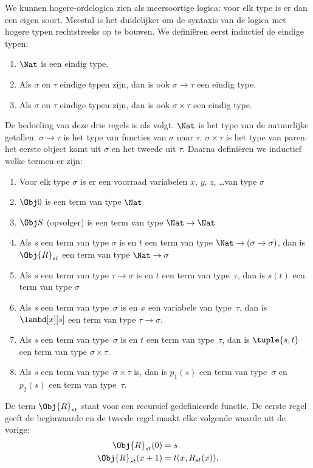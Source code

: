 \documentclass[openany]{memoir}
\begin{document}
We kunnen hogere-ordelogica zien als meersoortige logica: voor elk type is er
dan een eigen soort. Meestal is het duidelijker om de syntaxis van de logica
met hogere typen rechtstreeks op te bouwen. We definiëren eerst inductief de
eindige typen:
\begin{enumerate}
\item $\Nat$ is een eindig type.
\item Als $\sigma$ en $\tau$ eindige typen zijn, dan is ook $\sigma
  \to \tau$ een eindig type.
\item Als $\sigma$ en $\tau$ eindige typen zijn, dan is ook $\sigma \times
  \tau$ een eindig type.
\end{enumerate}
De bedoeling van deze drie regels is als volgt. $\Nat$ is het type van de
natuurlijke getallen. $\sigma \to \tau$ is het type van functies van
$\sigma$ naar $\tau$. $\sigma \times \tau$ is het type van paren: het eerste
object komt uit $\sigma$ en het tweede uit $\tau$. Daarna definiëren we
inductief welke termen er zijn:
\begin{enumerate}
\item Voor elk type $\sigma$ is er een voorraad variabelen $x$, $y$,
  $z$, \dots van type $\sigma$
\item $\Obj 0$ is een term van type $\Nat$
\item $\Obj S$ (opvolger) is een term van type $\Nat \to \Nat$
\item Als $s$ een term van type $\sigma$ is en $t$ een term van type
  $\Nat \to (\sigma \to \sigma)$, dan is $\Obj{R}_{st}$ een term van type
  $\Nat \to \sigma$
\item Als $s$ een term van type $\tau \to \sigma$ is en $t$ een
  term van type~$\tau$, dan is $s(t)$ een term van type $\sigma$
\item Als $s$ een term van type~$\sigma$ is en $x$ een variabele van
  type~$\tau$, dan is $\lambd[x][s]$ een term van type $\tau \to \sigma$.
\item Als $s$ een term van type~$\sigma$ is en $t$ een term van
  type~$\tau$, dan is $\tuple{s, t}$ een term van type $\sigma \times
  \tau$.
\item Als $s$ een term van type~$\sigma \times \tau$ is, dan is $p_1(s)$ een
  term van type~$\sigma$ en $p_2(s)$ een term van type~$\tau$.
\end{enumerate}
De term $\Obj{R}_{st}$ staat voor een recursief gedefinieerde functie. De
eerste regel geeft de beginwaarde en de tweede regel maakt elke volgende
waarde uit de vorige:
\begin{align*}
\Obj{R}_{st}(0) & = s \\
\Obj{R}_{st}(x+1) & = t(x, R_{st}(x)),
\end{align*}
\end{document}
